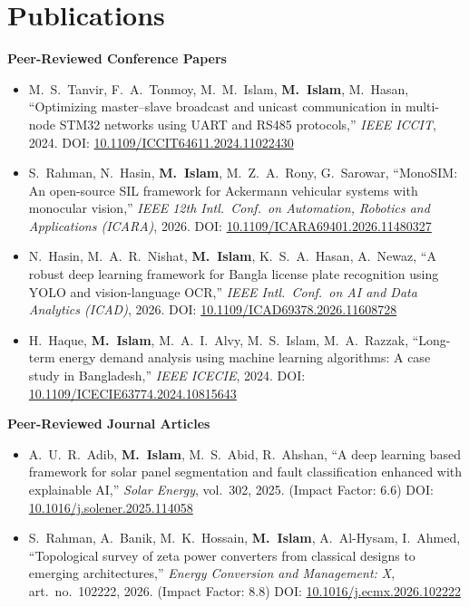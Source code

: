 \documentclass[10pt]{article}
\newcommand{\me}{\textbf{M.\ Islam}}
\begin{document}
\section*{Publications}

\textbf{Peer-Reviewed Conference Papers}
\begin{itemize}
    \item M.\ S.\ Tanvir, F.\ A.\ Tonmoy, M.\ M.\ Islam, \me, M.\ Hasan, ``Optimizing master--slave
    broadcast and unicast communication in multi-node STM32 networks using UART and RS485
    protocols,'' \textit{IEEE ICCIT}, 2024.
    DOI: \href{https://doi.org/10.1109/ICCIT64611.2024.11022430}{10.1109/ICCIT64611.2024.11022430}
    \item S.\ Rahman, N.\ Hasin, \me, M.\ Z.\ A.\ Rony, G.\ Sarowar, ``MonoSIM: An open-source SIL
    framework for Ackermann vehicular systems with monocular vision,'' \textit{IEEE 12th Intl.\
    Conf.\ on Automation, Robotics and Applications (ICARA)}, 2026.
    DOI: \href{https://doi.org/10.1109/ICARA69401.2026.11480327}{10.1109/ICARA69401.2026.11480327}
    \item N.\ Hasin, M.\ A.\ R.\ Nishat, \me, K.\ S.\ A.\ Hasan, A.\ Newaz, ``A robust deep learning
    framework for Bangla license plate recognition using YOLO and vision-language OCR,''
    \textit{IEEE Intl.\ Conf.\ on AI and Data Analytics (ICAD)}, 2026.
    DOI: \href{https://doi.org/10.1109/ICAD69378.2026.11608728}{10.1109/ICAD69378.2026.11608728}
    \item H.\ Haque, \me, M.\ A.\ I.\ Alvy, M.\ S.\ Islam, M.\ A.\ Razzak, ``Long-term energy demand
    analysis using machine learning algorithms: A case study in Bangladesh,'' \textit{IEEE ICECIE},
    2024.
    DOI: \href{https://doi.org/10.1109/ICECIE63774.2024.10815643}{10.1109/ICECIE63774.2024.10815643}
\end{itemize}

\textbf{Peer-Reviewed Journal Articles}
\begin{itemize}
    \item A.\ U.\ R.\ Adib, \me, M.\ S.\ Abid, R.\ Ahshan, ``A deep learning based framework for
    solar panel segmentation and fault classification enhanced with explainable AI,''
    \textit{Solar Energy}, vol.\ 302, 2025. (Impact Factor: 6.6)
    DOI: \href{https://doi.org/10.1016/j.solener.2025.114058}{10.1016/j.solener.2025.114058}
    \item S.\ Rahman, A.\ Banik, M.\ K.\ Hossain, \me, A.\ Al-Hysam, I.\ Ahmed, ``Topological survey
    of zeta power converters from classical designs to emerging architectures,''
    \textit{Energy Conversion and Management: X}, art.\ no.\ 102222, 2026. (Impact Factor: 8.8)
    DOI: \href{https://doi.org/10.1016/j.ecmx.2026.102222}{10.1016/j.ecmx.2026.102222}
\end{itemize}
\end{document}
